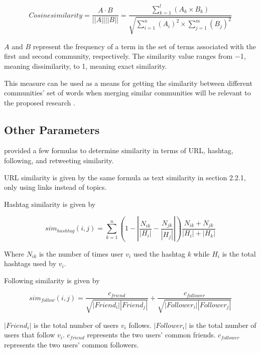 \begin{equation}
Cosine similarity = \frac {A \cdot B}{||A|| ||B||} = \frac {\sum_{k = 1}^{l}(A_k \times B_k)}{\sqrt{\sum_{i = 1}^{n} (A_i)^2 \times \sum_{j = 1}^{m} (B_j)^2}}
\end{equation}

$A$ and $B$ represent the frequency of a term in the set of terms associated with the first and second community, respectively. The similarity value ranges from −1, meaning dissimilarity, to 1, meaning exact similarity.

This measure can be used as a means for getting the similarity between different communities’ set of words when merging similar communities will be relevant to the proposed research \cite{Bakillah:2014}.

\subsection{Other Parameters}
 provided a few formulas to determine similarity in terms of URL, hashtag, following, and retweeting similarity.

URL similarity is given by the same formula as text similarity in section 2.2.1, only using links instead of topics.

Hashtag similarity is given by 

\begin{equation}
sim_{hashtag}(i,j) = \sum_{k=1}^n (1 - \left|{\frac{N_{ik}}{\left|{H_i}\right|} - \frac{N_{jk}}{\left|{H_j}\right|}}\right|)\frac{N_{ik} + N_{jk}}{\left|{H_i}\right| + \left|{H_k}\right|}
\end{equation}

Where $N_{ik}$ is the number of times user $v_i$ used the hashtag $k$ while $H_i$ is the total hashtags used by $v_i$.

Following similarity is given by 

\begin{equation}
sim_{follow}(i,j) = \frac{c_{friend}}{\sqrt{\left|{Friend_i}\right|\left|{Friend_j}\right|}} + \frac{c_{follower}}{\sqrt{\left|{Follower_i}\right|\left|{Follower_j}\right|}}
\end{equation}

$\left|{Friend_i}\right|$ is the total number of users $v_i$ follows. $\left|{Follower_i}\right|$ is the total number of users that follow $v_i$. $c_{friend}$ represents the two users’ common friends. $c_{follower}$ represents the two users’ common followers.


